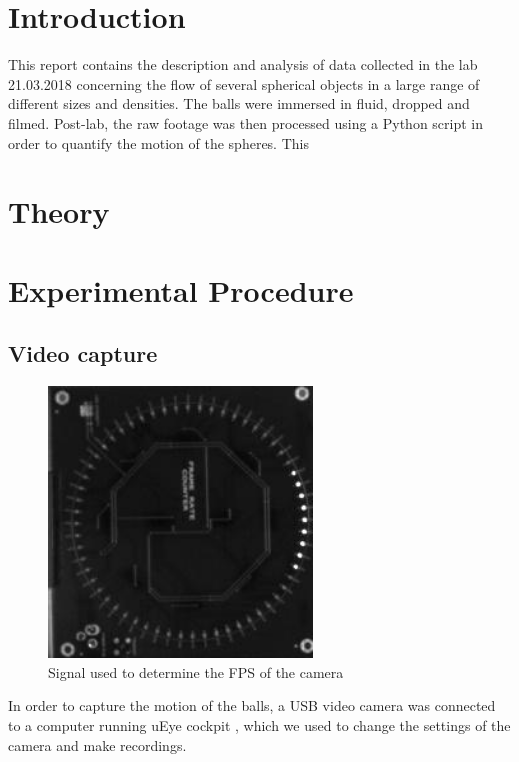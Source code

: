 \documentclass[11pt,a4paper]{article}
\begin{document}
\begin{multicols*}{2}
\section{\label{sect:intro}Introduction}
  This report contains the description and analysis of data collected in the lab 21.03.2018 concerning the flow of several spherical objects in a large range of different sizes and densities. The balls were immersed in fluid, dropped and filmed. Post-lab, the raw footage was then processed using a Python script in order to quantify the motion of the spheres. This 

\section{\label{sect:theory}Theory}

\section{\label{section:experimental}Experimental Procedure} 
  \subsection{Video capture}
    
    \begin{figure}[H]
      \center
      \includegraphics[width=7cm]{scripts/figs/sync_fps.png}
      \caption{Signal used to determine the FPS of the camera}
      \label{fig:FpsSignal}
    \end{figure}
  

    In order to capture the motion of the balls, a USB video camera was connected to a computer running uEye cockpit \cite{website:ueye}, which we used to change the settings of the camera and make recordings. 


\end{multicols*}
\end{document}
